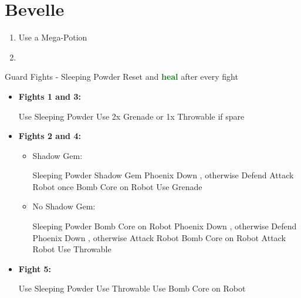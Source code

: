 \chapter{Bevelle}
\begin{enumerate}
	\item Use a Mega-Potion
	\item \formation{\tidus}{\auron}{\kimahri}
\end{enumerate}
\begin{battle}{Guard Fights - Sleeping Powder}
Reset \formation{\tidus}{\auron}{\kimahri} and \textbf{\textcolor{Green}{heal}} after every fight
\vspace{\baselineskip}
	\begin{itemize}
		\item \textbf{Fights 1 and 3:}
			\begin{itemize}
				\switch{\tidus}{\rikku}
				\rikkuf Use Sleeping Powder
				\rikkuf Use 2x Grenade or 1x Throwable if spare
			\end{itemize}
		\item \textbf{Fights 2 and 4:}
			\begin{itemize}
				\item Shadow Gem:
				\begin{itemize}
					\switch{\tidus}{\rikku}
					\rikkuf Sleeping Powder
					\rikkuf Shadow Gem
					\kimahrif Phoenix Down \rikku , otherwise Defend
					\auronf Attack Robot once
					\rikkuf Bomb Core on Robot
					\rikkuf Use Grenade
				\end{itemize}
				\item No Shadow Gem:
				\begin{itemize}
					\switch{\tidus}{\rikku}
					\rikkuf Sleeping Powder
					\rikkuf Bomb Core on Robot
					\kimahrif Phoenix Down \rikku , otherwise Defend
					\auronf Phoenix Down \kimahri, otherwise Attack Robot
					\rikkuf Bomb Core on Robot
					\auronf Attack Robot
					\rikkuf Use Throwable
				\end{itemize}
			\end{itemize}
		\item \textbf{Fight 5:}
			\begin{itemize}
				\switch{\tidus}{\rikku}
				\rikkuf Use Sleeping Powder
				\rikkuf Use Throwable
				\rikkuf Use Bomb Core on Robot
			\end{itemize}
	\end{itemize}
\end{battle}
